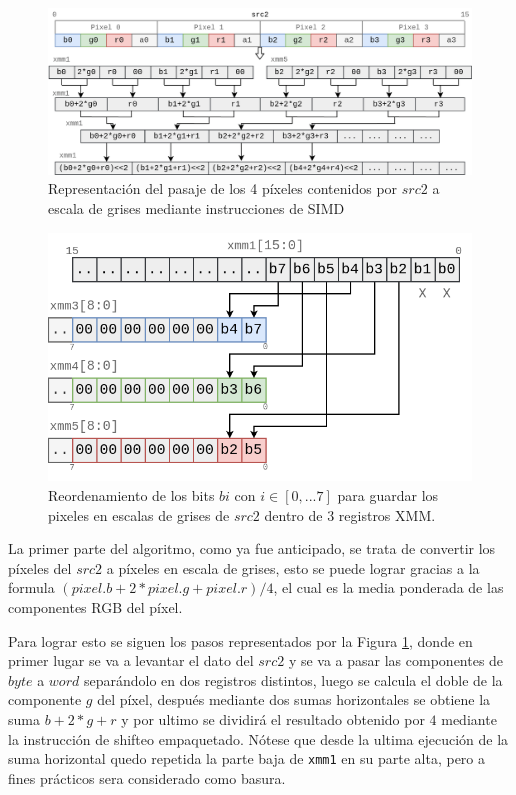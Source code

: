 \documentclass[a4paper]{article}
\begin{document}
\begin{figure}[h]
  \begin{center}
	\includegraphics[scale=0.30]{images/filtro-ocultar-1.png}
	\caption{Representación del pasaje de los 4 píxeles contenidos por $src2$ a escala de grises mediante instrucciones de SIMD}
	\label{fig:filtro-ocultar-1}
  \end{center}
\end{figure}

\begin{figure}[h!]
  \begin{center}
	\includegraphics[scale=0.38]{images/filtro-ocultar-2.png}
	\caption{Reordenamiento de los bits $bi$ con $i \in [0,...7]$ para guardar los pixeles en escalas de grises de $src2$ dentro de 3 registros XMM.}
	\label{fig:filtro-ocultar-2}
  \end{center}
\end{figure}

La primer parte del algoritmo, como ya fue anticipado, se trata de convertir los píxeles del $src2$ a píxeles en escala de grises, esto se puede lograr gracias a la formula $(pixel.b + 2*pixel.g + pixel.r)/4$, el cual es la media ponderada de las componentes RGB del píxel.

Para lograr esto se siguen los pasos representados por la Figura \ref{fig:filtro-ocultar-1}, donde en primer lugar se va a levantar el dato del $src2$ y se va a pasar las componentes de $byte$ a $word$ separándolo en dos registros distintos, luego se calcula el doble de la componente $g$ del píxel, después mediante dos sumas horizontales se obtiene la suma $b+2*g+r$ y por ultimo se dividirá el resultado obtenido por $4$ mediante la instrucción de shifteo empaquetado. Nótese que desde la ultima ejecución de la suma horizontal quedo repetida la parte baja de \texttt{xmm1} en su parte alta, pero a fines prácticos sera considerado como basura.
\end{document}
